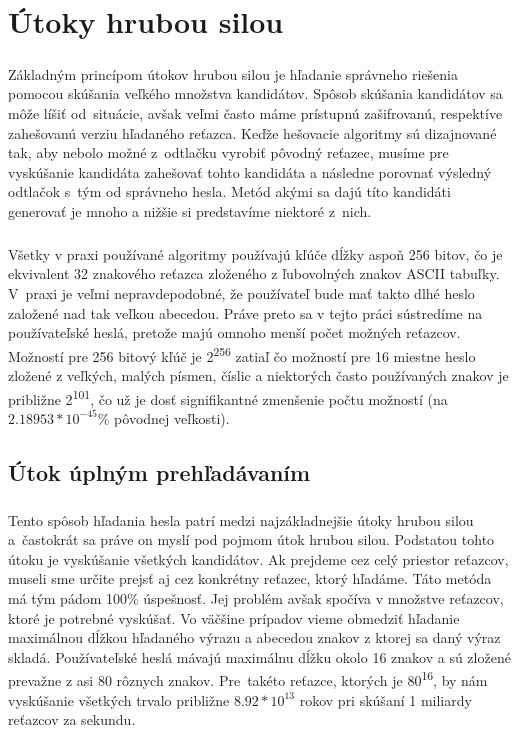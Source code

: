 \chapter{Útoky hrubou silou}
\paragraph{}
Základným princípom útokov hrubou silou je hľadanie správneho riešenia pomocou skúšania veľkého množstva kandidátov. Spôsob skúšania kandidátov sa môže líšiť od~situácie, avšak veľmi často máme prístupnú zašifrovanú, respektíve zahešovanú verziu hľadaného reťazca. Keďže hešovacie algoritmy sú dizajnované tak, aby nebolo možné z~odtlačku vyrobiť pôvodný reťazec, musíme pre vyskúšanie kandidáta zahešovať tohto kandidáta a následne porovnať výsledný odtlačok s~tým od správneho hesla. Metód akými sa dajú títo kandidáti generovať je mnoho a nižšie si predstavíme niektoré z~nich.

\paragraph{}
Všetky v praxi používané algoritmy používajú kľúče dĺžky aspoň 256 bitov, čo je ekvivalent 32 znakového reťazca zloženého z ľubovolných znakov ASCII tabuľky. V~praxi je veľmi nepravdepodobné, že používateľ bude mať takto dlhé heslo založené nad tak veľkou abecedou. Práve preto sa v tejto práci sústredíme na používateľské heslá, pretože majú omnoho menší počet možných reťazcov. Možností pre 256 bitový kľúč je 2\textsuperscript{256} zatiaľ čo možností pre 16 miestne heslo zložené z veľkých, malých písmen, číslic a niektorých často používaných znakov je približne 2\textsuperscript{101}, čo už je dosť signifikantné zmenšenie počtu možností (na \(2.18953*10^{-45} \%\) pôvodnej veľkosti).

\section{Útok úplným prehľadávaním}
\paragraph{}
Tento spôsob hľadania hesla patrí medzi najzákladnejšie útoky hrubou silou a~častokrát sa práve on myslí pod pojmom útok hrubou silou. Podstatou tohto útoku je vyskúšanie všetkých kandidátov. Ak prejdeme cez celý priestor reťazcov, museli sme určite prejsť aj cez konkrétny reťazec, ktorý hľadáme. Táto metóda má tým pádom 100\% úspešnosť. Jej problém avšak spočíva v množstve reťazcov, ktoré je potrebné vyskúšať. Vo väčšine prípadov vieme obmedziť hľadanie maximálnou dĺžkou hľadaného výrazu a abecedou znakov z ktorej sa daný výraz skladá. Používateľské heslá mávajú maximálnu dĺžku okolo 16 znakov a sú zložené prevažne z asi 80 rôznych znakov. Pre~takéto reťazce, ktorých je 80\textsuperscript{16}, by nám vyskúšanie všetkých trvalo približne \(8.92*10^{13}\) rokov pri skúšaní 1 miliardy reťazcov za sekundu.

